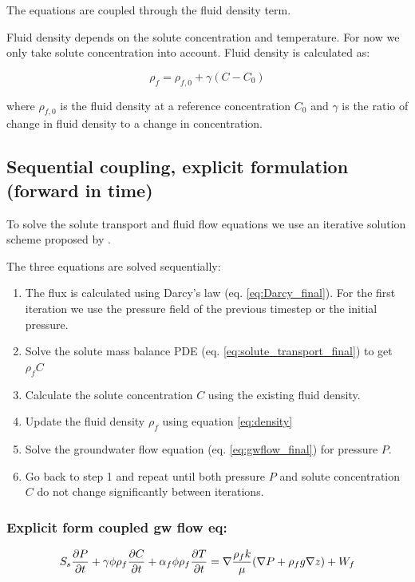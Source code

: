\documentclass[11pt]{article}
\begin{document}
The equations are coupled through the fluid density term. 

Fluid density depends on the solute concentration and temperature. For now we only take solute concentration into account. Fluid density is calculated as:

\begin{equation}
   \label{eq:density}
    \rho_f = \rho_{f,0} + \gamma (C - C_0)
\end{equation}

where $\rho_{f,0}$ is the fluid density at a reference concentration $C_0$ and $\gamma$ is the ratio of change in fluid density to a change in concentration. 


\subsection{Sequential coupling, explicit formulation (forward in time)}

To solve the solute transport and fluid flow equations we use an iterative solution scheme proposed by \cite{Ackerer2004}.

The three equations are solved sequentially:
\begin{enumerate}
\item
The flux is calculated using Darcy's law (eq. \ref{eq:Darcy_final}). For the first iteration we use the pressure field of the previous timestep or the initial pressure.
\item
Solve the solute mass balance PDE (eq. \ref{eq:solute_transport_final}) to get $\rho_f C$
\item
Calculate the solute concentration $C$ using the existing fluid density.
\item
Update the fluid density $\rho_f$ using equation \ref{eq:density}
\item
Solve the groundwater flow equation (eq. \ref{eq:gwflow_final}) for pressure $P$.
\item
Go back to step 1 and repeat until both pressure $P$ and solute concentration $C$ do not change significantly between iterations.
\end{enumerate}


\subsubsection{Explicit form coupled gw flow eq:}

\begin{equation}
	\label{eq:gwflow_full}
	 S_{s} { \partial P \over {\partial t} } + \gamma \phi \rho_f { \partial C \over{\partial t} } + \alpha_f \phi \rho_f {\partial T \over{\partial t} } = \nabla { \rho_f k \over{\mu} } (\nabla  P + \rho_f g \nabla z) + W_f
\end{equation}
\end{document}
